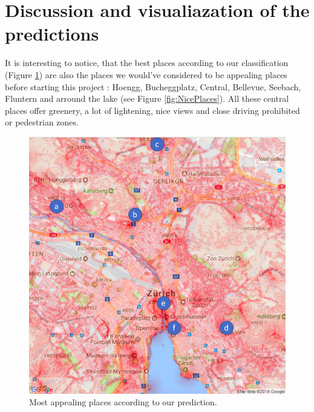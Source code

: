 \documentclass[letterpaper]{article}
\begin{document}
\section{Discussion and visualiazation of the predictions}

It is interesting to notice, that the best places according to our classification (Figure \ref{fig:NicePlacesLegend})
are also the places we would've considered to be appealing places before starting this project : 
Hoengg, Bucheggplatz, Central, Bellevue, Seebach, Fluntern and arround the lake (see Figure \ref{fig:NicePlaces}). All these central places
offer greenery, a lot of lightening, nice views and close driving prohibited or pedestrian
zones.

\begin{figure}[H]
    \centering
     \includegraphics[width=.9\linewidth]{images/good/combined_labeled.png}
    \caption{Most appealing places according to our prediction.}
    \label{fig:NicePlacesLegend}
\end{figure}
\end{document}
